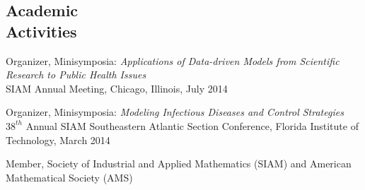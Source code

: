\documentclass[margin,line,pifont,palatino,courier]{res}
\newenvironment{list1}{
  \begin{list}{\ding{113}}{%
      \setlength{\itemsep}{0in}
      \setlength{\parsep}{0in} \setlength{\parskip}{0in}
      \setlength{\topsep}{0in} \setlength{\partopsep}{0in}
      \setlength{\leftmargin}{0.17in}}}{\end{list}}
\begin{document}
\begin{resume}





\section{\sc Academic \\ Activities}
Organizer, Minisymposia: \textit{Applications of Data-driven Models
  from Scientific Research to Public Health Issues} \\
SIAM Annual Meeting, Chicago, Illinois, July 2014

Organizer, Minisymposia: \textit{Modeling Infectious Diseases and Control Strategies} \\
$38^{th}$ Annual SIAM Southeastern Atlantic Section Conference, Florida Institute of Technology, March 2014

Member, Society of Industrial and Applied Mathematics (SIAM)
and American Mathematical Society (AMS)


\end{resume}
\end{document}
